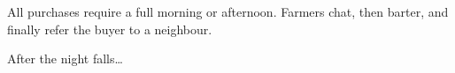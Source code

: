 \composeBailey

\section*{\baileyname}

\baileydesc

All purchases require a full morning or afternoon.
Farmers chat, then barter, and finally refer the buyer to a neighbour.

\begin{multicols}{3}

\baileymarkets

\end{multicols}

\begin{multicols}{2}

\baileymarketsWide

\end{multicols}

\vfill
{\hfill\sffamily After the night falls\ldots}

\clearpage

\begin{multicols}{2}

\baileyback

\end{multicols}

